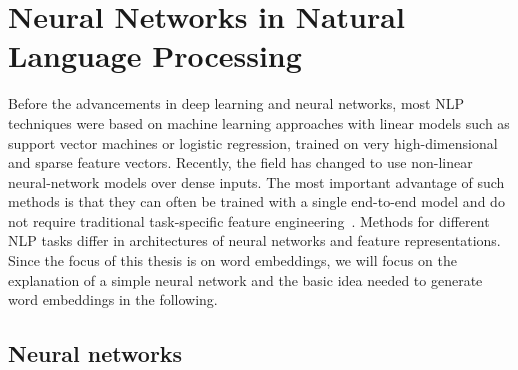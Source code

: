 \section{Neural Networks in Natural Language Processing}\label{sec:nn}
Before the advancements in deep learning and neural networks, most NLP techniques were based on machine learning approaches with linear models such as support vector machines or logistic regression, trained on very high-dimensional and sparse feature vectors. Recently, the field has changed to use non-linear neural-network models over dense inputs. The most important advantage of such methods is that they can often be trained with a single end-to-end model and do not require traditional task-specific feature engineering~. Methods for different NLP tasks differ in architectures of neural networks and feature representations. Since the focus of this thesis is on word embeddings, we will focus on the explanation of a simple neural network and the basic idea needed to generate word embeddings in the following. 
\subsection{Neural networks}

